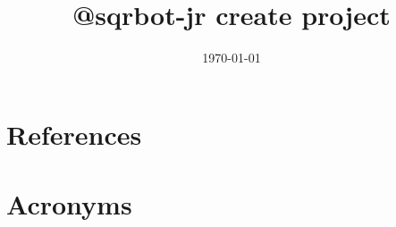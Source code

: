\documentclass[modern]{aastex62}
\begin{document}

\date{\today}
\title{@sqrbot-jr create project}





\appendix

\section{References} \label{sec:bib}



\section{Acronyms} \label{sec:acronyms}

\end{document}
